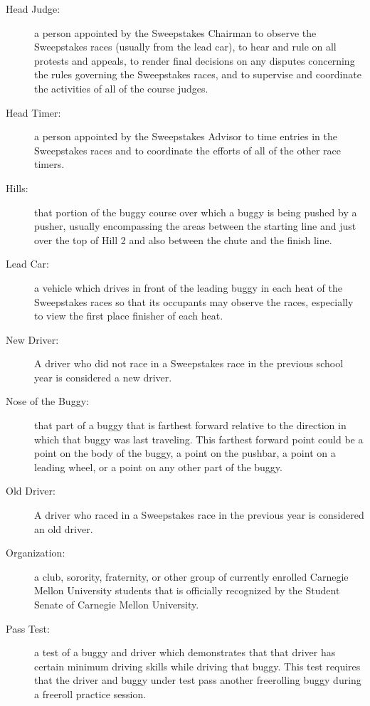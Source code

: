 \begin{description}
	\item[Head Judge:]
	a person appointed by the Sweepstakes Chairman to observe the Sweepstakes
	races (usually from the lead car), to hear and rule on all protests and
	appeals, to render final decisions on any disputes concerning the rules
	governing the Sweepstakes races, and to supervise and coordinate the activities
	of all of the course judges.

	\item[Head Timer:]
	a person appointed by the Sweepstakes Advisor to time entries in the
	Sweepstakes races and to coordinate the efforts of all of the other race
	timers.

	\item[Hills:]
	that portion of the buggy course over which a buggy is being pushed by a
	pusher, usually encompassing the areas between the starting line and just over
	the top of Hill 2 and also between the chute and the finish line.

	\item[Lead Car:]
	a vehicle which drives in front of the leading buggy in each heat of the
	Sweepstakes races so that its occupants may observe the races, especially to
	view the first place finisher of each heat.

	\item [New Driver:] A driver who did not race in a Sweepstakes race in the
		previous school year is considered a new driver.

	\item[Nose of the Buggy:]
	that part of a buggy that is farthest forward relative to the direction in
	which that buggy was last traveling. This farthest forward point could be a
	point on the body of the buggy, a point on the pushbar, a point on a leading
	wheel, or a point on any other part of the buggy.

    \item [Old Driver:] A driver who raced in a Sweepstakes race in the previous
		year is considered an old driver.

	\item[Organization:]
	a club, sorority, fraternity, or other group of currently enrolled Carnegie
	Mellon University students that is officially recognized by the Student Senate
	of Carnegie Mellon University.

	\item[Pass Test:]
	a test of a buggy and driver which demonstrates that that driver has
	certain minimum driving skills while driving that buggy. This test requires
	that the driver and buggy under test pass another freerolling buggy during a
	freeroll practice session.


\end{description}
